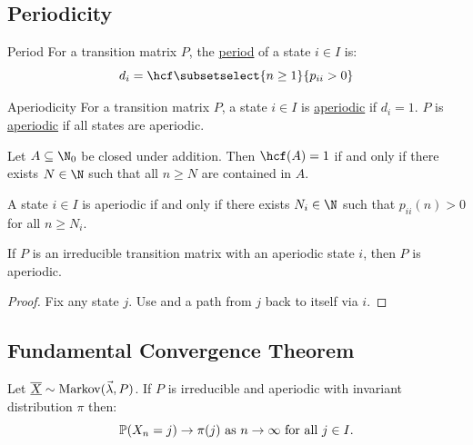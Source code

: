 \documentclass[../Main.tex]{subfiles}
\begin{document}
\subsection{Periodicity}
\begin{definition}{Period}
    For a transition matrix $P$, the \underline{period} of a state $i \in I$ is:
    \begin{equation*}
        d_i = \hcf\subsetselect{n \geq 1}{p_{ii} > 0}
    \end{equation*}
\end{definition}
\begin{definition}{Aperiodicity}
    For a transition matrix $P$, a state $i \in I$ is \underline{aperiodic} if $d_i = 1$. $P$ is \underline{aperiodic} if all states are aperiodic.
\end{definition}
\begin{lemma}
    Let $A \subseteq \N_0$ be closed under addition. Then $\hcf(A) = 1$ if and only if there exists $N \in \N$ such that all $n \geq N$ are contained in $A$.
    \label{lemHCFOne}
\end{lemma}
\begin{corollary}
    A state $i \in I$ is aperiodic if and only if there exists $N_i \in \N$ such that $p_{ii}(n) > 0$ for all $n \geq N_i$.
    \label{corAperiodicLimit}
\end{corollary}
\begin{lemma}
    If $P$ is an irreducible transition matrix with an aperiodic state $i$, then $P$ is aperiodic.
    \label{lemAperiodIsClassProp}
\end{lemma}
\begin{proof}
    Fix any state $j$. Use  and a path from $j$ back to itself via $i$.
\end{proof}
\subsection{Fundamental Convergence Theorem}
\begin{theorem}
    Let $\chain{X} \sim \Mkv{\vec{\lambda}}{P}$. If $P$ is irreducible and aperiodic with invariant distribution $\pi$ then:
    \begin{equation*}
        \P(X_n = j) \to \pi(j) \text{ as $n \to \infty$ for all $j \in I$.}
    \end{equation*}
    \label{thmFundamentalConvergence}
\end{theorem}
\end{document}
